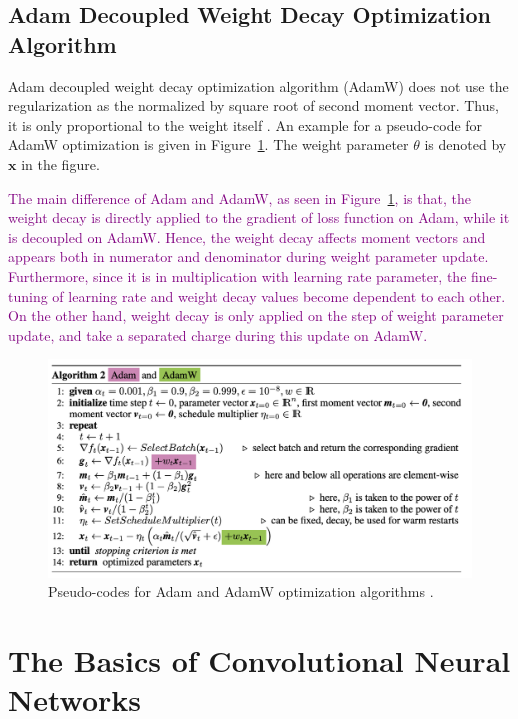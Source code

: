 \subsection{Adam Decoupled Weight Decay Optimization Algorithm}

Adam decoupled weight decay optimization algorithm (AdamW) does not use the regularization as the normalized by square root of second moment vector. Thus, it is only proportional to the weight itself \cite{Adam}. An example for a pseudo-code for AdamW optimization is given in Figure~\ref{fig:adam_and_adamw}. The weight parameter $\theta$ is denoted by $\textbf{x}$ in the figure.

\textcolor{purple}{The main difference of Adam and AdamW, as seen in Figure~\ref{fig:adam_and_adamw}, is that, the weight decay is directly applied to the gradient of loss function on Adam, while it is decoupled on AdamW. Hence, the weight decay affects moment vectors and appears both in numerator and denominator during weight parameter update. Furthermore, since it is in multiplication with learning rate parameter, the fine-tuning of learning rate and weight decay values become dependent to each other. On the other hand, weight decay is only applied on the step of weight parameter update, and take a separated charge during this update on AdamW.}

\begin{figure}[h]
	\centering
	\includegraphics[width=\linewidth]{fig/adam_n_adamw.png}
	\vspace*{1mm}
	\caption{Pseudo-codes for Adam and AdamW optimization algorithms \cite{weight_decay_regularization}.}
	\label{fig:adam_and_adamw}
\end{figure}

\section{The Basics of Convolutional Neural Networks} 
\label{sec:basics_of_cnn}

